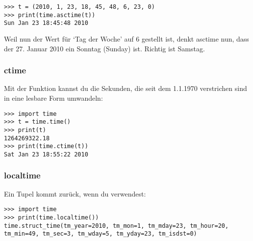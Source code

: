 \begin{Verbatim}[frame=single]
>>> t = (2010, 1, 23, 18, 45, 48, 6, 23, 0)
>>> print(time.asctime(t))
Sun Jan 23 18:45:48 2010
\end{Verbatim}

\noindent
Weil nun der Wert für `Tag der Woche' auf 6 gestellt ist, denkt asctime nun, dass der 27. Januar 2010 ein Sonntag (Sunday) ist. Richtig ist Samstag.

\subsubsection*{ctime}
Mit der  Funktion kannst du die Sekunden, die seit dem 1.1.1970 verstrichen sind in eine lesbare Form umwandeln:

\begin{Verbatim}[frame=single]
>>> import time
>>> t = time.time()
>>> print(t)
1264269322.18
>>> print(time.ctime(t))
Sat Jan 23 18:55:22 2010
\end{Verbatim}

\noindent
\subsubsection*{localtime}
Ein Tupel kommt zurück, wenn du  verwendest:

\begin{Verbatim}[frame=single]
>>> import time
>>> print(time.localtime())
time.struct_time(tm_year=2010, tm_mon=1, tm_mday=23, tm_hour=20, 
tm_min=49, tm_sec=3, tm_wday=5, tm_yday=23, tm_isdst=0)
\end{Verbatim}

